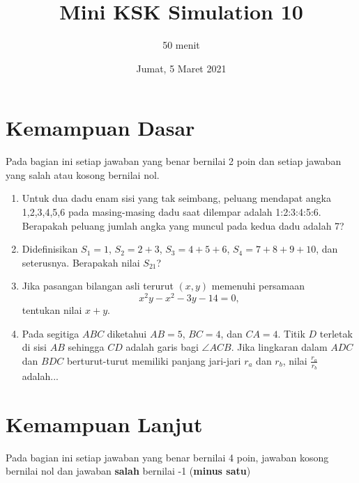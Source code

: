 \documentclass{article}
\title{Mini KSK Simulation 10}
\author{50 menit}
\date{Jumat, 5 Maret 2021}
\begin{document}
	\maketitle
	
	\section{Kemampuan Dasar}
	Pada bagian ini setiap jawaban yang benar bernilai 2 poin dan setiap jawaban yang salah
	atau kosong bernilai nol.
	\begin{enumerate}
		\item Untuk dua dadu enam sisi yang tak seimbang, peluang mendapat angka 1,2,3,4,5,6 pada masing-masing dadu saat dilempar adalah 1:2:3:4:5:6. Berapakah peluang jumlah angka yang muncul pada kedua dadu adalah 7?
		
		\item 
		Didefinisikan $S_1 = 1$, $S_2 = 2+3$, $S_3 = 4+5+6$, $S_4 = 7+8+9+10$, dan seterusnya. Berapakah nilai $S_{21}$?
		
		\item Jika pasangan bilangan asli terurut $(x,y)$ memenuhi persamaan $$x^2y-x^2-3y-14=0,$$ tentukan nilai $x+y$.
		
		\item Pada segitiga $ABC$ diketahui $AB = 5$, $BC = 4$, dan $CA = 4$. Titik $D$ terletak di sisi $AB$ sehingga $CD$ adalah garis bagi $\angle ACB$. Jika lingkaran dalam $ADC$ dan $BDC$ berturut-turut memiliki panjang jari-jari $r_a$ dan $r_b$, nilai $\frac{r_a}{r_b}$ adalah...
	\end{enumerate}

\section{Kemampuan Lanjut}
Pada bagian ini setiap jawaban yang benar bernilai 4 poin, jawaban kosong bernilai nol
dan jawaban \textbf{salah} bernilai -1 (\textbf{minus satu})
\end{document}
